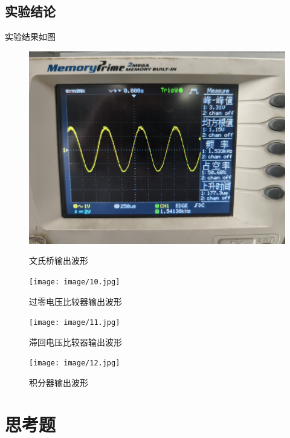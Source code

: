 \documentclass[10pt, a4paper]{article} %
\begin{document}
\subsection{实验结论}
实验结果如图
\begin{figure}[ht]
    \centering
    \begin{minipage}{0.23\textwidth}
        \centering
        \includegraphics[width=1.0\textwidth]{image/9.jpg}
        \caption{文氏桥输出波形}
        \label{fig:文氏桥输出波形}
    \end{minipage}
    \hfill
    \begin{minipage}{0.23\textwidth}
        \centering
        \texttt{[image: image/10.jpg]}
        \caption{过零电压比较器输出波形}
        \label{fig:电压比较器输出波形}
    \end{minipage}
    \hfill
    \begin{minipage}{0.23\textwidth}
        \centering
        \texttt{[image: image/11.jpg]}
        \caption{滞回电压比较器输出波形}
        \label{fig:滞回电压比较器输出波形}
    \end{minipage}
    \hfill
    \begin{minipage}{0.23\textwidth}
        \centering
        \texttt{[image: image/12.jpg]}
        \caption{积分器输出波形}
        \label{fig:积分器输出波形}
    \end{minipage}

\end{figure}
\section{思考题}
\end{document}
